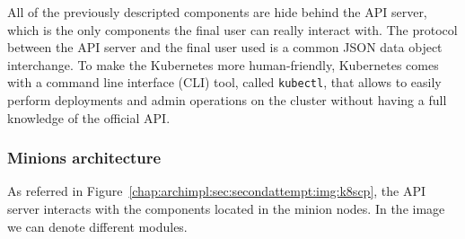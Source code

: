 All of the previously descripted components are hide behind the API server,
which is the only components the final user can really interact with. The
protocol between the API server and the final user used is a common JSON data
object interchange. To make the Kubernetes more human-friendly, Kubernetes comes
with a command line interface (CLI) tool, called \verb!kubectl!, that allows to
easily perform deployments and admin operations on the cluster without having a
full knowledge of the official API.

\subsubsection{Minions architecture}

As referred in Figure~\ref{chap:archimpl:sec:secondattempt:img:k8scp}, the API
server interacts with the components located in the minion nodes. In the image
we can denote different modules.
